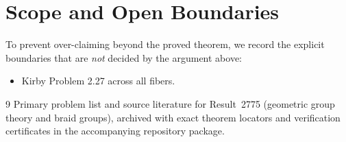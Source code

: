 \documentclass[10pt,reqno]{amsart}
\theoremstyle{definition}
\begin{document}
\section{Scope and Open Boundaries}

To prevent over-claiming beyond the proved theorem, we record the explicit boundaries that are \emph{not} decided by the argument above:
\begin{itemize}
  \item Kirby Problem 2.27 across all fibers.
\end{itemize}

\begin{thebibliography}{9}
Primary problem list and source literature for Result~2775 (geometric group theory and braid groups), archived with exact theorem locators and verification certificates in the accompanying repository package.
\end{thebibliography}
\end{document}
